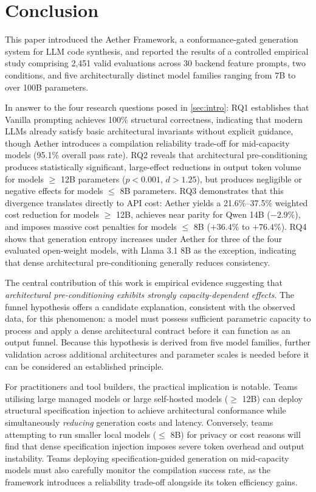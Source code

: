 \documentclass[review,12pt,3p]{elsarticle}
\begin{document}
\section{Conclusion}
\label{sec:conclusion}

This paper introduced the Aether Framework, a conformance-gated generation system for
LLM code synthesis, and reported the results of a controlled empirical study
comprising 2,451 valid evaluations across 30 backend feature prompts, two conditions, and
five architecturally distinct model families ranging from 7B to over 100B parameters.

In answer to the four research questions posed in \cref{sec:intro}: RQ1 establishes that
Vanilla prompting achieves 100\% structural correctness, indicating that modern LLMs already
satisfy basic architectural invariants without explicit guidance, though Aether introduces a compilation reliability trade-off for mid-capacity models (95.1\% overall pass rate). RQ2 reveals that
architectural pre-conditioning produces statistically significant, large-effect reductions
in output token volume for models $\ge$ 12B parameters ($p < 0.001$, $d > 1.25$), but produces
negligible or negative effects for models $\le$ 8B parameters. RQ3 demonstrates that this
divergence translates directly to API cost: Aether yields a 21.6\%--37.5\% weighted cost
reduction for models $\ge$ 12B, achieves near parity for Qwen 14B ($-2.9\%$), and imposes
massive cost penalties for models $\le$ 8B ($+36.4\%$ to $+76.4\%$). RQ4 shows that generation
entropy increases under Aether for three of the four evaluated open-weight models, with Llama 3.1 8B as
the exception, indicating that dense architectural pre-conditioning
generally reduces consistency.

The central contribution of this work is empirical evidence suggesting that
\emph{architectural pre-conditioning exhibits strongly capacity-dependent effects}. The funnel
hypothesis offers a candidate explanation, consistent with the observed data, for this
phenomenon: a model must possess sufficient parametric capacity to process and apply a dense
architectural contract before it can function as an output funnel. Because this hypothesis is
derived from five model families, further validation across additional architectures and
parameter scales is needed before it can be considered an established principle.

For practitioners and tool builders, the practical implication is notable. Teams utilising large
managed models or large self-hosted models ($\ge$ 12B) can deploy structural specification
injection to achieve architectural conformance while simultaneously \emph{reducing} generation
costs and latency. Conversely, teams attempting to run smaller local models ($\le$ 8B) for
privacy or cost reasons will find that dense specification injection imposes severe token
overhead and output instability. Teams deploying specification-guided generation on mid-capacity
models must also carefully monitor the compilation success rate, as the framework introduces a
reliability trade-off alongside its token efficiency gains.
\end{document}
